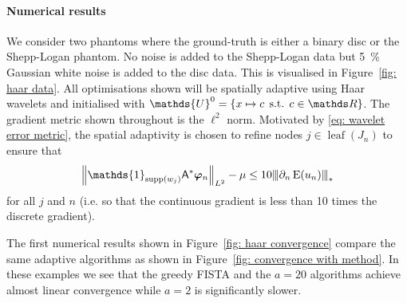 \documentclass[smallextended]{svjour3}
\let\F\mathds\let\C\mathcal\newcommand{\R}{\F{R}}\newcommand{\A}{\tens{A}}
\newcommand{\norm}[1]{{\left\lVert #1 \right\rVert}}
\newcommand{\Norm}[1]{{\left\vert\kern-0.25ex\left\vert\kern-0.25ex\left\vert #1 \right\vert\kern-0.25ex\right\vert\kern-0.25ex\right\vert}}
\newcommand{\op}[1]{\operatorname{#1}}
\newcommand{\1}{\F{1}}
\DeclareMathOperator{\st}{\;s.t.\;}
\DeclareMathOperator{\supp}{supp}
\newcommand*{\varf}[1]{%
	\IfEqCase{#1}{%
		{0}{u}%
		{1}{v}%
		{2}{w}%
	}[u#1]%
}
\newcommand*{\spcf}[1]{%
	\IfEqCase{#1}{%
		{0}{\F{U}}%
		{1}{\F{V}}%
		{2}{\F{W}}%
	}[\F{U}#1]%
}
\newcommand*{\vard}[1]{%
	\IfEqCase{#1}{%
		{0}{\varphi}%
		{1}{\psi}%
	}[\varphi #1]%
}
\newcommand*{\varx}[1]{%
	\IfEqCase{#1}{%
		{0}{x}%
		{1}{y}%
		{2}{z}%
		{3}{r}%
	}[x#1]%
}
\newcommand*{\vvard}[1]{\vec{\vard{#1}}}
\begin{document}
	\paragraph{Numerical results}
	We consider two phantoms where the ground-truth is either a binary disc or the Shepp-Logan phantom. No noise is added to the Shepp-Logan data but \SI{5}{\percent} Gaussian white noise is added to the disc data. This is visualised in Figure~\ref{fig: haar data}. All optimisations shown will be spatially adaptive using Haar wavelets and initialised with $\spcf0^0= \{\varx0\mapsto c\st c\in\F R\}$. The gradient metric shown throughout is the $\ell^2$ norm. Motivated by \eqref{eq: wavelet error metric}, the spatial adaptivity is chosen to refine nodes $j\in\op{leaf}(J_n)$ to ensure that 
	$$ \norm{\1_{\supp(w_j)}\A^*\vvard0_n}_{L^2} -\mu  \leq 10\Norm{\partial_n\op{E}(\varf0_n)}_*$$
	for all $j$ and $n$ (i.e. so that the continuous gradient is less than 10 times the discrete gradient).
	
	The first numerical results shown in Figure~\ref{fig: haar convergence} compare the same adaptive algorithms as shown in Figure~\ref{fig: convergence with method}. In these examples we see that the greedy FISTA and the $a=20$ algorithms achieve almost linear convergence while $a=2$ is significantly slower.
	
\end{document}
